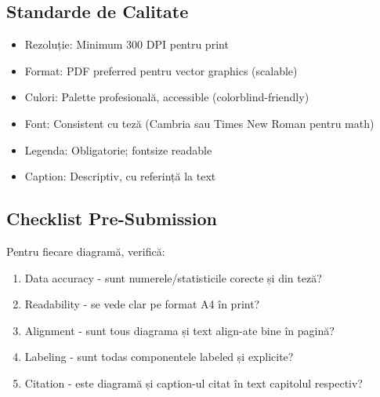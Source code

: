 \subsection{Standarde de Calitate}

\begin{itemize}
    \item Rezoluție: Minimum 300 DPI pentru print
    \item Format: PDF preferred pentru vector graphics (scalable)
    \item Culori: Palette profesională, accessible (colorblind-friendly)
    \item Font: Consistent cu teză (Cambria sau Times New Roman pentru math)
    \item Legenda: Obligatorie; fontsize readable
    \item Caption: Descriptiv, cu referință la text
\end{itemize}

\subsection{Checklist Pre-Submission}

Pentru fiecare diagramă, verifică:
\begin{enumerate}
    \item Data accuracy - sunt numerele/statisticile corecte și din teză?
    \item Readability - se vede clar pe format A4 în print?
    \item Alignment - sunt tous diagrama și text align-ate bine în pagină?
    \item Labeling - sunt todas componentele labeled și explicite?
    \item Citation - este diagramă și caption-ul citat în text capitolul respectiv?
\end{enumerate}

